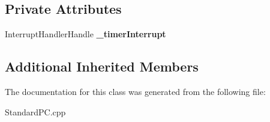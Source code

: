 \subsection*{Private Attributes}
\begin{DoxyCompactItemize}
\item 
\mbox{\label{class_standard_p_c___internal_1_1_timer_a3b2fe6178daae8caab11c5d484cde4d3}} 
Interrupt\+Handler\+Handle {\bfseries \+\_\+timer\+Interrupt}
\end{DoxyCompactItemize}
\subsection*{Additional Inherited Members}


The documentation for this class was generated from the following file\+:\begin{DoxyCompactItemize}
\item 
Standard\+P\+C.\+cpp\end{DoxyCompactItemize}
